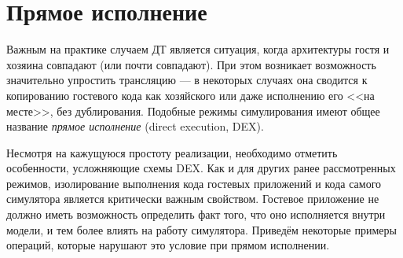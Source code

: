 \section{Прямое исполнение}\label{sec:dex}

Важным на практике случаем ДТ является ситуация, когда архитектуры гостя и хозяина совпадают (или почти совпадают). При этом возникает возможность значительно упростить трансляцию --- в некоторых случаях она сводится к копированию гостевого кода как хозяйского или даже исполнению его <<на месте>>, без дублирования. Подобные режимы симулирования имеют общее название \textit{прямое исполнение} (\abbr direct execution, DEX). 

Несмотря на кажущуюся простоту реализации, необходимо отметить особенности, усложняющие схемы DEX. Как и для других ранее рассмотренных режимов, изолирование выполнения кода гостевых приложений и кода самого симулятора является критически важным свойством. Гостевое приложение не должно иметь возможность определить факт того, что оно исполняется внутри модели, и тем более влиять на работу симулятора. Приведём некоторые примеры операций, которые нарушают это условие при прямом исполнении.

